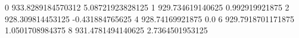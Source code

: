 0 933.8289184570312 5.08721923828125
1 929.734619140625 0.992919921875
2 928.309814453125 -0.431884765625
4 928.74169921875 0.0
6 929.7918701171875 1.0501708984375
8 931.4781494140625 2.7364501953125
